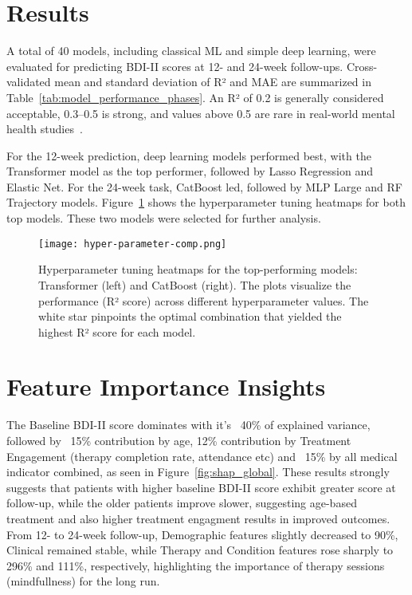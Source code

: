 \documentclass[conference]{IEEEtran}
\begin{document}
\section{Results}

A total of 40 models, including classical ML and simple deep learning, were evaluated for predicting BDI-II scores at 12- and 24-week follow-ups. Cross-validated mean and standard deviation of R² and MAE are summarized in Table~\ref{tab:model_performance_phases}. An R² of 0.2 is generally considered acceptable, 0.3–0.5 is strong, and values above 0.5 are rare in real-world mental health studies~\cite{b6,b7,b8}.

For the 12-week prediction, deep learning models performed best, with the Transformer model as the top performer, followed by Lasso Regression and Elastic Net. For the 24-week task, CatBoost led, followed by MLP Large and RF Trajectory models. Figure~\ref{fig:hyper_param_tuned} shows the hyperparameter tuning heatmaps for both top models. These two models were selected for further analysis.


\begin{figure}[th]
    \centering
    \texttt{[image: hyper-parameter-comp.png]}
    \caption{Hyperparameter tuning heatmaps for the top-performing models: Transformer (left) and CatBoost (right). The plots visualize the performance (R² score) across different hyperparameter values. The white star pinpoints the optimal combination that yielded the highest R² score for each model.}
    \label{fig:hyper_param_tuned}
\end{figure}

\section{Feature Importance Insights}
The Baseline BDI-II score dominates with it's ~40\% of explained variance, followed by ~15\% contribution by age, 12\% contribution by Treatment Engagement (therapy completion rate, attendance etc) and ~15\% by all medical indicator combined, as seen in Figure~\ref{fig:shap_global}. These results strongly suggests that patients with higher baseline BDI-II score exhibit greater score at follow-up, while the older patients improve slower, suggesting age-based treatment and also higher treatment engagment results in improved outcomes. From 12- to 24-week follow-up, Demographic features slightly decreased to 90\%, Clinical remained stable, while Therapy and Condition features rose sharply to 296\% and 111\%, respectively, highlighting the importance of therapy sessions (mindfullness) for the long run.
\end{document}
